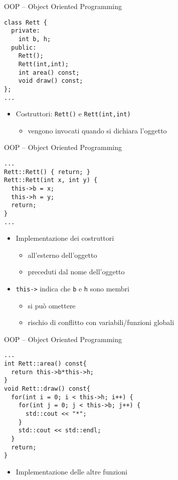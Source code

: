 \begin{frame}[fragile]{OOP -- Object Oriented Programming}
  \vfill
  \begin{lstlisting}[firstnumber=2]
class Rett {
  private:
    int b, h;
  public:
    Rett();
    Rett(int,int);
    int area() const;
    void draw() const;
};
...
  \end{lstlisting}
  \vfill
  \begin{itemize}
    \item \alert{Costruttori}: \lstinline$Rett()$ e \lstinline$Rett(int,int)$
    \begin{itemize}
      \item vengono invocati quando si dichiara l'oggetto
    \end{itemize}
  \end{itemize}
  \vfill
\end{frame}

\begin{frame}[fragile]{OOP -- Object Oriented Programming}
  \vfill
  \begin{lstlisting}[firstnumber=16]
...
Rett::Rett() { return; }
Rett::Rett(int x, int y) {
  this->b = x;
  this->h = y;
  return;
}
...\end{lstlisting}
  \vfill
  \begin{itemize}
    \item Implementazione dei costruttori
    \begin{itemize}
      \item all'esterno dell'oggetto
      \item preceduti dal nome dell'oggetto
    \end{itemize}
    \vfill
    \item \lstinline$this->$ indica che \lstinline$b$ e \lstinline$h$ sono membri
    \begin{itemize}
      \item si può omettere
      \item rischio di conflitto con variabili/funzioni globali
    \end{itemize}
  \end{itemize}
  \vfill
\end{frame}

\begin{frame}[fragile]{OOP -- Object Oriented Programming}
  \vfill
  \begin{lstlisting}[firstnumber=22]
...
int Rett::area() const{
  return this->b*this->h;
}
void Rett::draw() const{
  for(int i = 0; i < this->h; i++) {
    for(int j = 0; j < this->b; j++) {
      std::cout << "*";
    }
    std::cout << std::endl;
  }
  return;
}
  \end{lstlisting}
  \vfill
  \begin{itemize}
    \item Implementazione delle altre funzioni
  \end{itemize}
  \vfill
\end{frame}

